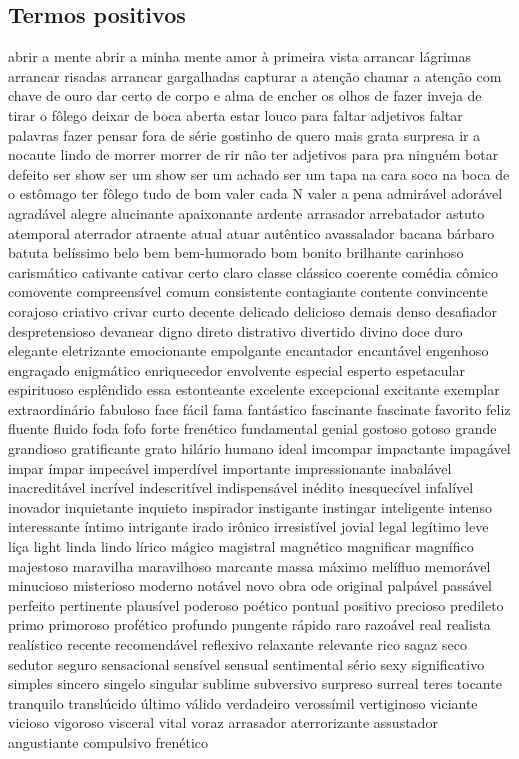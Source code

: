 \begin{appendices}
\subsection{Termos positivos}
abrir a mente abrir a minha mente amor \`{a} primeira vista arrancar l\'{a}grimas arrancar risadas arrancar gargalhadas capturar a aten\c{c}\~ao chamar a aten\c{c}\~ao com chave de ouro dar certo de corpo e alma de encher os olhos de fazer inveja de tirar o f\^{o}lego deixar de boca aberta estar louco para faltar adjetivos faltar palavras fazer pensar fora de s\'{e}rie gostinho de quero mais grata surpresa ir a nocaute lindo de morrer morrer de rir n\~ao ter adjetivos para pra ningu\'{e}m botar defeito ser show ser um show ser um achado ser um tapa na cara soco na boca de o est\^{o}mago ter f\^{o}lego tudo de bom valer cada N valer a pena admir\'{a}vel ador\'{a}vel agrad\'{a}vel alegre alucinante apaixonante ardente arrasador arrebatador astuto atemporal aterrador atraente atual atuar aut\^{e}ntico avassalador bacana b\'{a}rbaro batuta bel\'{i}ssimo belo bem bem-humorado bom bonito brilhante carinhoso carism\'{a}tico cativante cativar certo claro classe cl\'{a}ssico coerente com\'{e}dia c\^{o}mico comovente compreens\'{i}vel comum consistente contagiante contente convincente corajoso criativo crivar curto decente delicado delicioso demais denso desafiador despretensioso devanear digno direto distrativo divertido divino doce duro elegante eletrizante emocionante empolgante encantador encant\'{a}vel engenhoso engra\c{c}ado enigm\'{a}tico enriquecedor envolvente especial esperto espetacular espirituoso espl\^{e}ndido essa estonteante excelente excepcional excitante exemplar extraordin\'{a}rio fabuloso face f\'{a}cil fama fant\'{a}stico fascinante fascinate favorito feliz fluente fluido foda fofo forte fren\'{e}tico fundamental genial gostoso gotoso grande grandioso gratificante grato hil\'{a}rio humano ideal imcompar impactante impag\'{a}vel impar \'{i}mpar impec\'{a}vel imperd\'{i}vel importante impressionante inabal\'{a}vel inacredit\'{a}vel incr\'{i}vel indescrit\'{i}vel indispens\'{a}vel in\'{e}dito inesquec\'{i}vel infal\'{i}vel inovador inquietante inquieto inspirador instigante instingar inteligente intenso interessante \'{i}ntimo intrigante irado ir\^{o}nico irresist\'{i}vel jovial legal leg\'{i}timo leve li\c{c}a light linda lindo l\'{i}rico m\'{a}gico magistral magn\'{e}tico magnificar magn\'{i}fico majestoso maravilha maravilhoso marcante massa m\'{a}ximo mel\'{i}fluo memor\'{a}vel minucioso misterioso moderno not\'{a}vel novo obra ode original palp\'{a}vel pass\'{a}vel perfeito pertinente plaus\'{i}vel poderoso po\'{e}tico pontual positivo precioso predileto primo primoroso prof\'{e}tico profundo pungente r\'{a}pido raro razo\'{a}vel real realista real\'{i}stico recente recomend\'{a}vel reflexivo relaxante relevante rico sagaz seco sedutor seguro sensacional sens\'{i}vel sensual sentimental s\'{e}rio sexy significativo simples sincero singelo singular sublime subversivo surpreso surreal teres tocante tranquilo transl\'{u}cido \'{u}ltimo v\'{a}lido verdadeiro veross\'{i}mil vertiginoso viciante vicioso vigoroso visceral vital voraz arrasador aterrorizante assustador angustiante compulsivo fren\'{e}tico 
\end{appendices}
